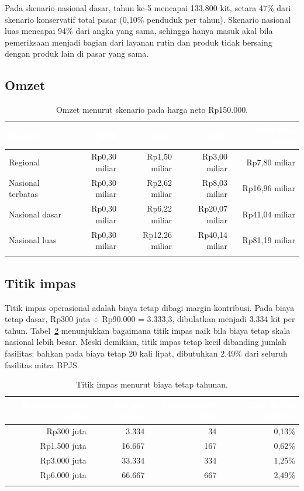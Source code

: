 \documentclass[11pt,a4paper]{article}
\newcommand{\tH}[1]{\textcolor{white}{\sffamily\bfseries\small #1}}
\newcommand{\tabstart}{\small\rowcolors{2}{white}{pale}\arrayrulecolor{rule}}
\newcommand{\hdrrow}{\rowcolor{tealdark}}
\renewcommand{\toprule}{\arrayrulecolor{tealdark}\specialrule{0.9pt}{0pt}{0pt}\arrayrulecolor{rule}}
\renewcommand{\bottomrule}{\arrayrulecolor{tealdark}\specialrule{0.9pt}{0pt}{0pt}\arrayrulecolor{rule}}
\begin{document}
Pada skenario nasional dasar, tahun ke-5 mencapai 133.800 kit, setara 47\% dari skenario konservatif total pasar (0,10\% penduduk per tahun). Skenario nasional luas mencapai 94\% dari angka yang sama, sehingga hanya masuk akal bila pemeriksaan menjadi bagian dari layanan rutin dan produk tidak bersaing dengan produk lain di pasar yang sama.

\subsection{Omzet}

\begin{table}[htbp]
\centering
\caption{Omzet menurut skenario pada harga neto Rp150.000.}
\label{tab:omzet}
\tabstart
\begin{tabular}{@{}lrrrr@{}}
\toprule
\hdrrow\tH{Skenario} & \tH{2028} & \tH{2030} & \tH{2032} & \tH{Total lima tahun} \\
\midrule
Regional & Rp0,30 miliar & Rp1,50 miliar & Rp3,00 miliar & Rp7,80 miliar \\
Nasional terbatas & Rp0,30 miliar & Rp2,62 miliar & Rp8,03 miliar & Rp16,96 miliar \\
Nasional dasar & Rp0,30 miliar & Rp6,22 miliar & Rp20,07 miliar & Rp41,04 miliar \\
Nasional luas & Rp0,30 miliar & Rp12,26 miliar & Rp40,14 miliar & Rp81,19 miliar \\
\bottomrule
\end{tabular}
\end{table}

\subsection{Titik impas}

Titik impas operasional adalah biaya tetap dibagi margin kontribusi. Pada biaya tetap dasar, Rp300 juta $\div$ Rp90.000 = 3.333,3, dibulatkan menjadi 3.334 kit per tahun. Tabel~\ref{tab:bepn} menunjukkan bagaimana titik impas naik bila biaya tetap skala nasional lebih besar. Meski demikian, titik impas tetap kecil dibanding jumlah fasilitas: bahkan pada biaya tetap 20 kali lipat, dibutuhkan 2,49\% dari seluruh fasilitas mitra BPJS.

\begin{table}[htbp]
\centering
\caption{Titik impas menurut biaya tetap tahunan.}
\label{tab:bepn}
\tabstart
\begin{tabular}{@{}rrrr@{}}
\toprule
\hdrrow\tH{Biaya tetap per tahun} & \tH{Kit per tahun} & \tH{Fasilitas (100 kit)} & \tH{Dari 26.759 fasilitas} \\
\midrule
Rp300 juta & 3.334 & 34 & 0,13\% \\
Rp1.500 juta & 16.667 & 167 & 0,62\% \\
Rp3.000 juta & 33.334 & 334 & 1,25\% \\
Rp6.000 juta & 66.667 & 667 & 2,49\% \\
\bottomrule
\end{tabular}
\end{table}
\end{document}
